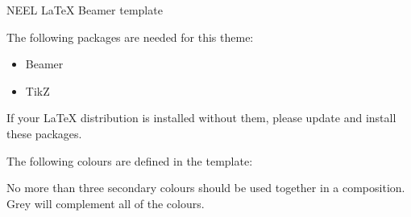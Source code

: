 \documentclass[usenames,dvipsnames]{beamer}
\begin{document}
\begin{frame}{NEEL {\LaTeX} Beamer template}

The following packages are needed for this theme:

\begin{itemize}
\item Beamer
\item TikZ
\end{itemize}

If your {\LaTeX} distribution is installed without them, please update and install these packages.

The following colours are defined in the template:
\begin{center}
\end{center}

No more than three secondary colours should be used together in a composition. Grey will complement all of the colours.

\end{frame}

\end{document}
